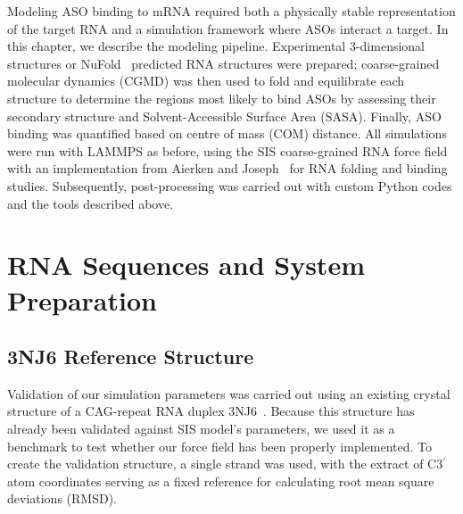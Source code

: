
Modeling ASO binding to mRNA required both a physically stable representation of the target RNA and a simulation framework where ASOs interact a target.
In this chapter, we describe the modeling pipeline. Experimental 3-dimensional structures or NuFold~\cite{Kagaya2025} predicted RNA structures were prepared; coarse-grained molecular dynamics (CGMD) was then used to fold and equilibrate each structure to determine the regions most likely to bind ASOs by assessing their secondary structure and Solvent-Accessible Surface Area (SASA). Finally, ASO binding was quantified based on centre of mass (COM) distance. All simulations were run with LAMMPS as before, using the SIS coarse-grained RNA force field~\cite{Thompson2022} with an implementation from Aierken and Joseph~\cite{Aierken2024} for RNA folding and binding studies. Subsequently, post-processing was carried out with custom Python codes and the tools described above.
\section{RNA Sequences and System Preparation}
\label{sec:system_prep}

\subsection{3NJ6 Reference Structure}
\label{sec:3nj6}

Validation of our simulation parameters was carried out using an existing crystal structure of a CAG-repeat RNA duplex 3NJ6~\cite{Aierken2024}. Because this structure has already been validated against SIS model’s parameters, we used it as a benchmark to test whether our force field has been properly implemented. To create the validation structure, a single strand was used, with the extract of C3$^\prime$ atom coordinates serving as a fixed reference for calculating root mean square deviations (RMSD).

